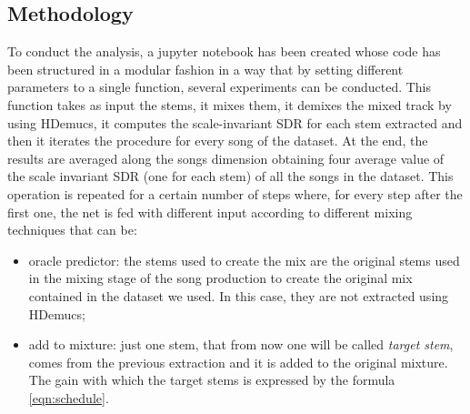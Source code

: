 \documentclass{article}
\begin{document}
\begin{sloppy}
\section{Methodology}
\label{sec:method}
To conduct the analysis, a jupyter notebook\footnotemark{} has been created whose code has been structured in a modular fashion in a way that by setting different parameters to a single function, several experiments can be conducted.  This function takes as input the stems, it mixes them, it demixes the mixed track by using HDemucs, it computes the scale-invariant SDR for each stem extracted and then it iterates the procedure for every song of the dataset. At the end, the results are averaged along the songs dimension obtaining four average value of the scale invariant SDR (one for each stem) of all the songs in the dataset. This operation is repeated for a certain number of steps where, for every step after the first one, the net is fed with different input according to different mixing techniques that can be:
\begin{itemize}
    \item oracle predictor: the stems used to create the mix are the original stems used in the mixing stage of the song production to create the original mix contained in the dataset we used. In this case, they are not extracted using HDemucs;
    \item add to mixture: just one stem, that from now one will be called \textit{target stem}, comes from the previous extraction and it is added to the original mixture. The gain with which the target stems is expressed by the formula \ref{eqn:schedule}.


\end{itemize}
\end{sloppy}
\end{document}
